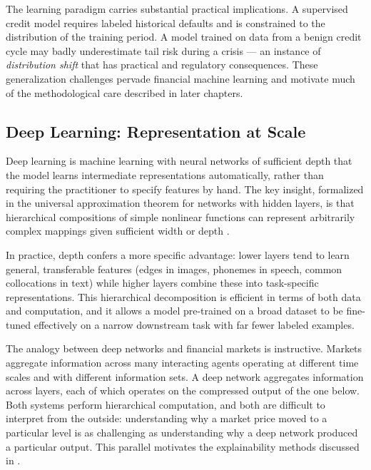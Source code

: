 The learning paradigm carries substantial practical implications.
A supervised credit model requires labeled historical defaults and is
constrained to the distribution of the training period.  A model trained
on data from a benign credit cycle may badly underestimate tail risk during
a crisis --- an instance of \emph{distribution shift} that has practical
and regulatory consequences.  These generalization challenges pervade
financial machine learning and motivate much of the methodological care
described in later chapters.

\subsection{Deep Learning: Representation at Scale}
\label{subsec:deep-learning-representation}

Deep learning is machine learning with neural networks of sufficient depth
that the model learns intermediate representations automatically, rather
than requiring the practitioner to specify features by hand.  The key
insight, formalized in the universal approximation theorem for networks
with hidden layers, is that hierarchical compositions of simple nonlinear
functions can represent arbitrarily complex mappings given sufficient
width or depth \parencite{goodfellow2016deep}.

In practice, depth confers a more specific advantage: lower layers tend to
learn general, transferable features (edges in images, phonemes in speech,
common collocations in text) while higher layers combine these into
task-specific representations.  This hierarchical decomposition is
efficient in terms of both data and computation, and it allows a model
pre-trained on a broad dataset to be fine-tuned effectively on a narrow
downstream task with far fewer labeled examples.

\begin{context}
The analogy between deep networks and financial markets is instructive.
Markets aggregate information across many interacting agents operating at
different time scales and with different information sets.  A deep network
aggregates information across layers, each of which operates on the
compressed output of the one below.  Both systems perform hierarchical
computation, and both are difficult to interpret from the outside:
understanding why a market price moved to a particular level is as
challenging as understanding why a deep network produced a particular
output.  This parallel motivates the explainability methods discussed in
.
\end{context}

